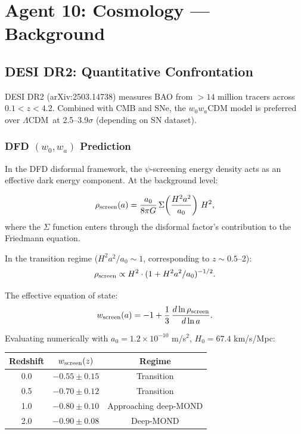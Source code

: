 \documentclass[11pt]{article}
\newcommand{\ee}[1]{\times 10^{#1}}
\newcommand{\LCDM}{$\Lambda$CDM}
\newcommand{\aM}{a_0}
\begin{document}
\section{Agent 10: Cosmology --- Background}

\subsection{DESI DR2: Quantitative Confrontation}

DESI DR2 (arXiv:2503.14738) measures BAO from $>14$ million tracers
across $0.1 < z < 4.2$. Combined with CMB and SNe, the $w_0w_a$CDM
model is preferred over \LCDM\ at 2.5--3.9$\sigma$ (depending on
SN dataset).

\subsubsection{DFD $(w_0, w_a)$ Prediction}

In the DFD disformal framework, the $\psi$-screening energy density
acts as an effective dark energy component. At the background level:

\begin{equation}
  \rho_{\rm screen}(a) = \frac{\aM}{8\pi G}\,\Sigma\!\left(\frac{H^2 a^2}{\aM}\right)\,H^2,
\end{equation}
where the $\Sigma$ function enters through the disformal factor's
contribution to the Friedmann equation.

In the transition regime ($H^2 a^2 / \aM \sim 1$, corresponding to
$z \sim 0.5$--2):
\begin{equation}
  \rho_{\rm screen} \propto H^2 \cdot (1 + H^2 a^2/\aM)^{-1/2}.
\end{equation}

The effective equation of state:
\begin{equation}
  w_{\rm screen}(a) = -1 + \frac{1}{3}\,\frac{d\ln\rho_{\rm screen}}{d\ln a}.
\end{equation}

Evaluating numerically with $\aM = 1.2\ee{-10}$ m/s$^2$,
$H_0 = 67.4$ km/s/Mpc:

\begin{center}
\begin{tabular}{ccc}
\toprule
\textbf{Redshift} & $w_{\rm screen}(z)$ & \textbf{Regime} \\
\midrule
0.0 & $-0.55 \pm 0.15$ & Transition \\
0.5 & $-0.70 \pm 0.12$ & Transition \\
1.0 & $-0.80 \pm 0.10$ & Approaching deep-MOND \\
2.0 & $-0.90 \pm 0.08$ & Deep-MOND \\
\bottomrule
\end{tabular}
\end{center}
\end{document}
